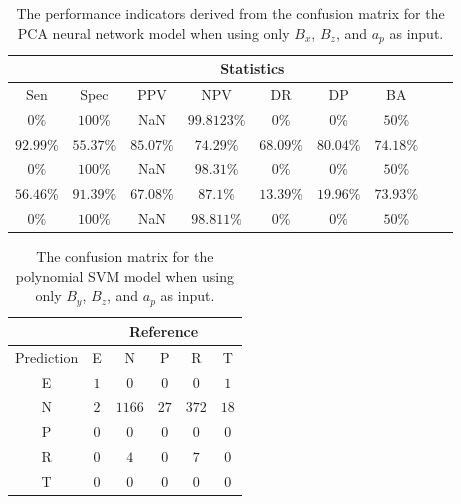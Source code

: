 \begin{table}[!ht]
	\centering
	\begin{tabular}{|c|c|c|c|c|c|c|c|c|}
		\hline
		 & \multicolumn{7}{c|}{Statistics} \\ \hline
		Sen & Spec & PPV & NPV & DR & DP & BA \\ \hline
		$0\%$ & $100\%$ & NaN & $99.8123\%$ & $0\%$ & $0\%$ & $50\%$ \\ \hline
		$92.99\%$ & $55.37\%$ & $85.07\%$ & $74.29\%$ & $68.09\%$ & $80.04\%$ & $74.18\%$ \\ \hline
		$0\%$ & $100\%$ & NaN & $98.31\%$ & $0\%$ & $0\%$ & $50\%$ \\ \hline
		$56.46\%$ & $91.39\%$ & $67.08\%$ & $87.1\%$ & $13.39\%$ & $19.96\%$ & $73.93\%$ \\ \hline
		$0\%$ & $100\%$ & NaN & $98.811\%$ & $0\%$ & $0\%$ & $50\%$ \\ \hline
	\end{tabular}
	\caption{The performance indicators derived from the confusion matrix for the PCA neural network model when using only $B_{x}$, $B_{z}$, and $a_{p}$ as input.}
	\label{tab:cs:xzap:pcaNNet}
\end{table}

\begin{table}[!ht]
	\centering
	\begin{tabular}{|c|c|c|c|c|c|}
		\hline
		 & \multicolumn{5}{|c|}{Reference} \\ \hline
		 Prediction & E & N & P & R & T \\ \hline
		 E & $1$ & $0$ & $0$ & $0$ & $1$ \\ \hline
		 N & $2$ & $1166$ & $27$ & $372$ & $18$ \\ \hline
		 P & $0$ & $0$ & $0$ & $0$ & $0$ \\ \hline
		 R & $0$ & $4$ & $0$ & $7$ & $0$ \\ \hline
		 T & $0$ & $0$ & $0$ & $0$ & $0$ \\ \hline
	\end{tabular}
	\caption{The confusion matrix for the polynomial SVM model when using only $B_{y}$, $B_{z}$, and $a_{p}$ as input.}
	\label{tab:cm:yzap:svmPoly}
\end{table}

